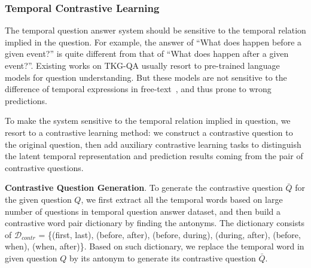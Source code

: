 \documentclass[11pt]{article}
\newcommand{\xhdr}[1]{{\noindent\bfseries #1}.}
\newcommand{\gt}[1]{{{\textcolor{cyan}{[gt: #1]}}}}
\begin{document}
\begin{comment}
\noindent \textbf{Entity Answer Prediction.}
After getting the predicted time representation $t_q$, we first calculate the object entity embedding $e_q$ using entity function $F_E$
\begin{equation}
e_q = F_E(e_s, r_{entity}, t_q) = \langle e_s, r_{entity}, t_q \rangle
\end{equation}

Similar to the time estimation, the score function for entity is 
\begin{equation}
\mathcal{S}_e = Re(\langle e_q, e \rangle), e \in E_q
\end{equation}

\end{comment}

\subsubsection{Temporal Contrastive Learning}

The temporal question answer system should be sensitive to the temporal relation implied in the question. For example, the answer of ``What does happen before a given event?'' is quite different from that of ``What does happen after a given event?''. Existing works on TKG-QA usually resort to pre-trained language models for question understanding. But these models are not sensitive to the difference of temporal expressions in free-text~\cite{ning2020torque,dhingra2021time,shang2021open,han2021econet}, and thus prone to wrong predictions. 

To make the system %
sensitive to the temporal relation implied in question, we resort to a contrastive learning method: %
we construct a contrastive question to the original question, then add auxiliary contrastive learning tasks to distinguish the latent temporal representation and prediction results coming from the pair of contrastive questions.


\xhdr{Contrastive Question Generation} To generate the contrastive question $\bar{Q}$ for the given question $Q$, we first extract all the temporal words based on large number of questions in temporal question answer dataset, and then build a contrastive word pair dictionary by finding the antonyms. The dictionary consists of $\mathcal{D}_{contr}$ = \{(first, last), (before, after), (before, during), (during, after), (before, when), (when, after)\}. Based on such dictionary, we replace the temporal word in given question $Q$ by its antonym to generate its contrastive question $\bar{Q}$.
\end{document}

